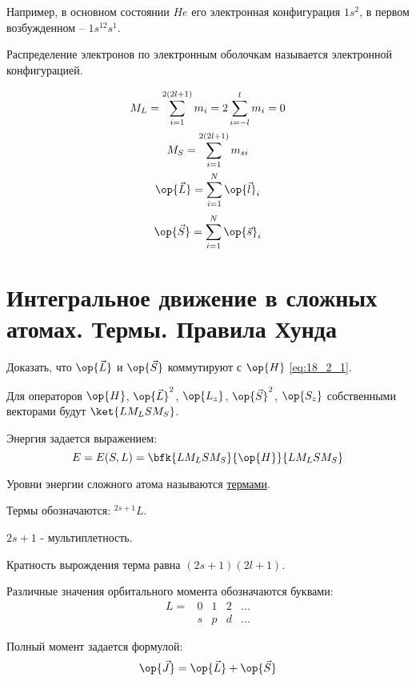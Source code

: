 Например, в основном состоянии $He$ его электронная конфигурация  $1s^2$, в первом возбужденном -- $1s^12s^1$.

\begin{defn}
Распределение электронов по электронным оболочкам называется электронной конфигурацией. 
\end{defn}

\begin{gather*}
M_L = \sum_{i = 1}^{2(2l+1)} m_i = 2 \sum_{i=-l}^l m_i = 0 \\ 
M_S = \sum_{i = 1}^{2(2l+1)} m_{si} \\
\op{\vec{L}} = \sum_{i = 1}^{N} \op{\vec{l}}_i \\
\end{gather*}
\begin{equation}
\label{eq:18_2_3}
\op{\vec{S}} = \sum_{i = 1}^{N} \op{\vec{s}}_i
\end{equation}
\section{Интегральное движение в сложных атомах. Термы. Правила Хунда}

\begin{excr}
Доказать, что $\op{\vec{L}}$ и $\op{\vec{S}}$ коммутируют с $\op{H}$ \eqref{eq:18_2_1}.
\end{excr}

Для операторов $\op{H}$, $\op{\vec{L}}^2$, $\op{L_z}$, $\op{\vec{S}}^2$, $\op{S_z}$ собственными векторами будут $\ket{L M_L S M_S}$.

Энергия задается выражением: 
$$
E = E(S, L) = \bfk{L M_L S M_S}{\op{H}}{L M_L S M_S}
$$ 

Уровни энергии сложного атома называются \underline{термами}.

Термы обозначаются: $\boxed{^{2s+1}L}$.

$2s+1$ - мультиплетность.

Кратность вырождения терма равна $(2s+1)(2l+1)$.

Различные значения орбитального момента обозначаются буквами:
$$ 
\begin{matrix}
L= & 0 & 1 & 2& ...\\
      & s & p & d & ... 
\end{matrix}
$$

Полный момент задается формулой:
\begin{equation}
\label{eq:18_3_1}
\op{\vec{J}} = \op{\vec{L}} + \op{\vec{S}}
\end{equation}

